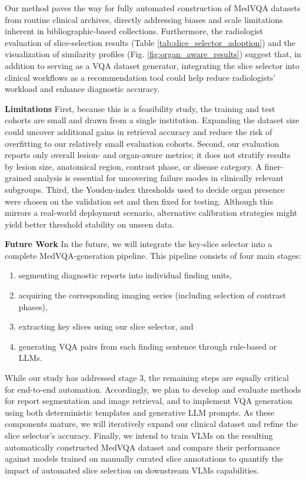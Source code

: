 \documentclass[bioengineering,article,submit,pdftex,moreauthors]{Definitions/mdpi}
\begin{document}
Our method paves the way for fully automated construction of MedVQA datasets from routine clinical archives, directly addressing biases and scale limitations inherent in bibliographic-based collections. 
Furthermore, the radiologist evaluation of slice-selection results (Table \ref{tab:slice_selector_adoption}) and the visualization of similarity profiles (Fig. \ref{fig:organ_aware_results}) suggest that, in addition to serving as a VQA dataset generator, integrating the slice selector into clinical workflows as a recommendation tool could help reduce radiologists’ workload and enhance diagnostic accuracy. 


\textbf{Limitations}
First, because this is a feasibility study, the training and test cohorts are small and drawn from a single institution. Expanding the dataset size could uncover additional gains in retrieval accuracy and reduce the risk of overﬁtting to our relatively small evaluation cohorts. 
Second, our evaluation reports only overall lesion- and organ-aware metrics; it does not stratify results by lesion size, anatomical region, contrast phase, or disease category. A finer-grained analysis is essential for uncovering failure modes in clinically relevant subgroups. 
Third, the Youden-index thresholds used to decide organ presence were chosen on the validation set and then fixed for testing. Although this mirrors a real-world deployment scenario, alternative calibration strategies might yield better threshold stability on unseen data. 


\textbf{Future Work}
In the future, we will integrate the key-slice selector into a complete MedVQA-generation pipeline. 
This pipeline consists of four main stages: 
\begin{enumerate}
  \item segmenting diagnostic reports into individual finding units, 
  \item acquiring the corresponding imaging series (including selection of contrast phases),
  \item extracting key slices using our slice selector, and 
  \item generating VQA pairs from each finding sentence through rule-based or LLMs.
\end{enumerate}
While our study has addressed stage 3, 
the remaining steps are equally critical for end-to-end automation.
Accordingly, we plan to develop and evaluate methods for report segmentation and image retrieval, 
and to implement VQA generation using both deterministic templates and generative LLM prompts. 
As these components mature, we will iteratively expand our clinical dataset and refine the slice selector’s accuracy. 
Finally, we intend to train VLMs on the resulting automatically constructed MedVQA dataset and compare their performance against 
models trained on manually curated slice annotations to quantify the impact of automated slice selection on downstream VLMs capabilities.
\end{document}
